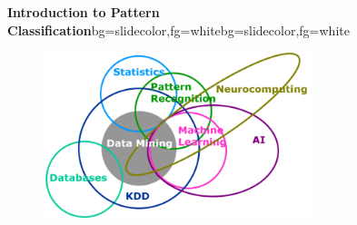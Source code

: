 \subsection{}
\begin{frame}{}
\begin{variableblock}{\centering \Large \textbf{\vspace{4pt}\newline Introduction to Pattern Classification\vspace{4pt}}}{bg=slidecolor,fg=white}{bg=slidecolor,fg=white}
\end{variableblock}
\begin{figure}
\centering
\includegraphics[width=0.7\textwidth]{Figures/domain.png}
\end{figure}
\end{frame}

